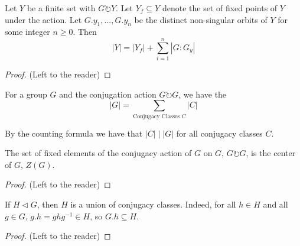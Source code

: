 \documentclass[12pt, a4paper, oneside, openright, titlepage]{book}
\begin{document}
\begin{namthm}
        Let $Y$ be a finite set with $G \circlearrowright Y$. Let $Y_f \subseteq Y$ denote the set of fixed points of $Y$ under the action. Let $G.y_1, ..., G.y_n$ be the distinct non-singular orbits of $Y$ for some integer $n \geq 0$. Then \begin{equation}
                |Y| = |Y_f| + \sum_{i=1}^n|G:G_y|
        \end{equation}
\end{namthm}
\begin{proof}
        (Left to the reader)
\end{proof}

\begin{cor}
        For a group $G$ and the conjugation action $G \circlearrowright G$, we have the  \begin{equation}
                |G| = \sum\limits_{\text{Conjugacy Classes $C$}}|C|
        \end{equation}
\end{cor}

\begin{rmk}
        By the counting formula we have that $|C|\;\vert\;|G|$ for all conjugacy classes $C$.
\end{rmk}


\begin{prop}
        The set of fixed elements of the conjugacy action of $G$ on $G$, $G \circlearrowright G$, is the center of $G$, $Z(G)$.
\end{prop}
\begin{proof}
        (Left to the reader)
\end{proof}


\begin{prop}
        If $H \vartriangleleft G$, then $H$ is a union of conjugacy classes. Indeed, for all $h \in H$ and all $g \in G$, $g.h=ghg^{-1} \in H$, so $G.h \subseteq H$.
\end{prop}
\begin{proof}
        (Left to the reader)
\end{proof}
\end{document}
